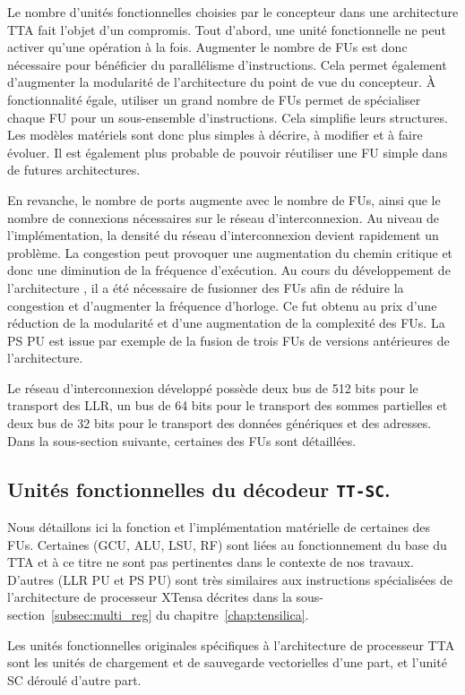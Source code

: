 Le nombre d'unités fonctionnelles choisies par le concepteur dans une architecture TTA fait l'objet d'un compromis.
Tout d'abord, une unité fonctionnelle ne peut activer qu'une opération à la fois.
Augmenter le nombre de FUs est donc nécessaire pour bénéficier du parallélisme d'instructions.
Cela permet également d'augmenter la modularité de l'architecture du point de vue du concepteur.
\`A fonctionnalité égale, utiliser un grand nombre de FUs permet de spécialiser chaque FU pour un sous-ensemble d'instructions. Cela simplifie leurs structures. Les modèles matériels sont donc plus simples à décrire, à modifier et à faire évoluer. Il est également plus probable de pouvoir réutiliser une FU simple dans de futures architectures.

En revanche, le nombre de ports augmente avec le nombre de FUs, ainsi que le nombre de connexions nécessaires sur le réseau d'interconnexion.
Au niveau de l'implémentation, la densité du réseau d'interconnexion devient rapidement un problème. 
La congestion peut provoquer une augmentation du chemin critique et donc une diminution de la fréquence d'exécution. 
Au cours du développement de l'architecture \TTSC, il a été nécessaire de fusionner des FUs afin de réduire la congestion et d'augmenter la fréquence d'horloge. Ce fut obtenu au prix d'une réduction de la modularité et d'une augmentation de la complexité des FUs. La PS PU est issue par exemple de la fusion de trois FUs de versions antérieures de l'architecture.

Le réseau d'interconnexion développé possède deux bus de 512 bits pour le transport des LLR, un bus de 64 bits pour le transport des sommes partielles et deux bus de 32 bits pour le transport des données génériques et des adresses.
Dans la sous-section suivante, certaines des FUs sont détaillées.

\subsection{Unités fonctionnelles du décodeur \texttt{TT-SC}.}
Nous détaillons ici la fonction et l'implémentation matérielle de certaines des FUs. Certaines (GCU, ALU, LSU, RF) sont liées au fonctionnement du base du TTA et à ce titre ne sont pas pertinentes dans le contexte de nos travaux. D'autres (LLR PU et PS PU) sont très similaires aux instructions spécialisées de l'architecture de processeur XTensa décrites dans la sous-section~\ref{subsec:multi_reg} du chapitre~\ref{chap:tensilica}.

Les unités fonctionnelles originales spécifiques à l'architecture de processeur TTA sont les unités de chargement et de sauvegarde vectorielles d'une part, et l'unité \og SC déroulé \fg d'autre part.

